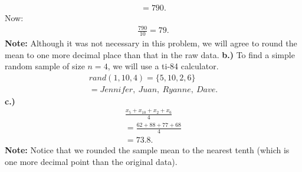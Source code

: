 \documentclass{report}
\begin{document}
\begin{mdframed}
\begin{align*}
              = 790
          .\end{align*}
          \bigbreak \noindent 
          Now:
          \begin{align*}
              \frac{790}{10} 
              = 79
          .\end{align*}
          \bigbreak \noindent 
          \textbf{Note:} Although it was not necessary in this problem, we will agree to round the mean to one more decimal place than that in the raw data.
          \bigbreak \noindent 
          \textbf{b.)} To find a simple random sample of size $n=4$, we will use a ti-84 calculator.
          \begin{align*}
              rand(1,10,4) = \{5,10,2,6\} \\
              = Jennifer,\ Juan,\ Ryanne,\ Dave
          .\end{align*}
          \bigbreak \noindent 
          \textbf{c.)} 
          \begin{align*}
              \frac{x_{5} + x_{10} + x_{2} + x_{6}}{4} \\
              = \frac{62 + 88 + 77 +68}{4} \\
              = 73.8
          .\end{align*}
          \bigbreak \noindent 
          \textbf{Note:} Notice that we rounded the sample mean to the nearest tenth (which is one more decimal point than the original data).
        \end{mdframed}
\end{document}
